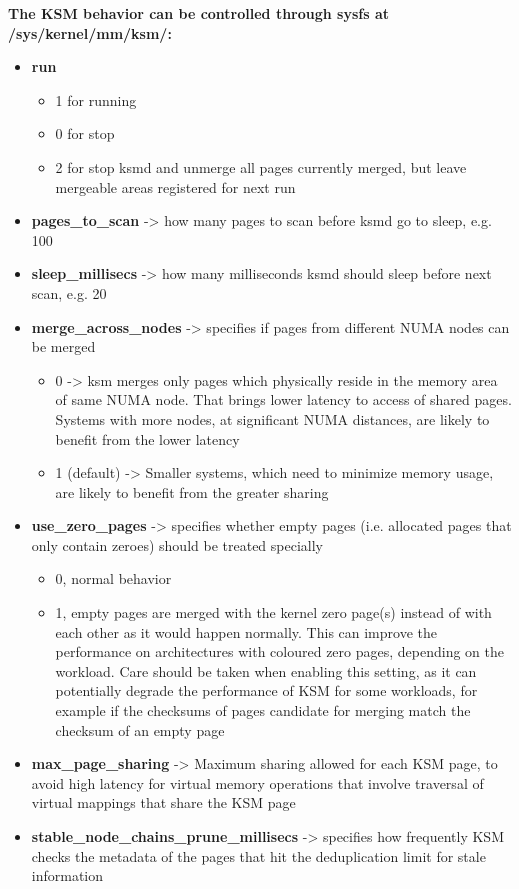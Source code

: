 \textbf{The KSM behavior can be controlled through sysfs at /sys/kernel/mm/ksm/:}
\begin{itemize}
\item \textbf{run}
  \begin{itemize}
  \item 1 for running
  \item 0 for stop
  \item 2 for stop ksmd and unmerge all pages currently merged, but leave mergeable areas registered for next run
  \end{itemize}
\item \textbf{pages\_to\_scan} -> how many pages to scan before ksmd go to sleep, e.g. 100
\item \textbf{sleep\_millisecs} -> how many milliseconds ksmd should sleep before next scan, e.g. 20
\item \textbf{merge\_across\_nodes} -> specifies if pages from different NUMA nodes can be merged
  \begin{itemize}
  \item 0 -> ksm merges only pages which physically reside in the memory area of same NUMA node. That brings lower latency to access of shared pages. Systems with more nodes, at significant NUMA distances, are likely to benefit from the lower latency
  \item 1 (default) -> Smaller systems, which need to minimize memory usage, are likely to benefit from the greater sharing
  \end{itemize}
\item \textbf{use\_zero\_pages} -> specifies whether empty pages (i.e. allocated pages that only contain zeroes) should be treated specially
  \begin{itemize}
  \item 0, normal behavior
  \item 1, empty pages are merged with the kernel zero page(s) instead of with each other as it would happen normally. This can improve the performance on architectures with coloured zero pages, depending on the workload. Care should be taken when enabling this setting, as it can potentially degrade the performance of KSM for some workloads, for example if the checksums of pages candidate for merging match the checksum of an empty page
  \end{itemize}
\item \textbf{max\_page\_sharing} -> Maximum sharing allowed for each KSM page, to avoid high latency for virtual memory operations that involve traversal of virtual mappings that share the KSM page
\item \textbf{stable\_node\_chains\_prune\_millisecs} -> specifies how frequently KSM checks the metadata of the pages that hit the deduplication limit for stale information
\end{itemize}

